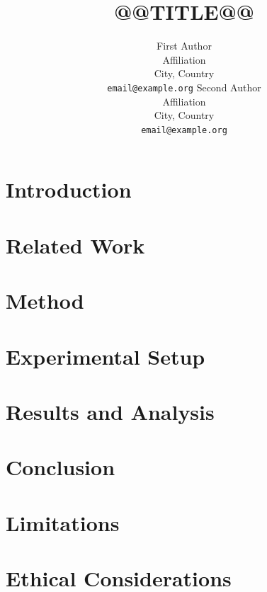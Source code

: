 \documentclass[11pt]{article}
\title{@@TITLE@@}
\author{First Author \\ Affiliation \\ City, Country \\ \texttt{email@example.org}
  \And Second Author \\ Affiliation \\ City, Country \\ \texttt{email@example.org}}
\begin{document}
\maketitle

\begin{abstract}

\end{abstract}

\section{Introduction}\label{sec:intro}


\section{Related Work}\label{sec:related}


\section{Method}\label{sec:method}


\section{Experimental Setup}\label{sec:setup}


\section{Results and Analysis}\label{sec:results}


\section{Conclusion}\label{sec:conclusion}


\section*{Limitations}


\section*{Ethical Considerations}

\end{document}
